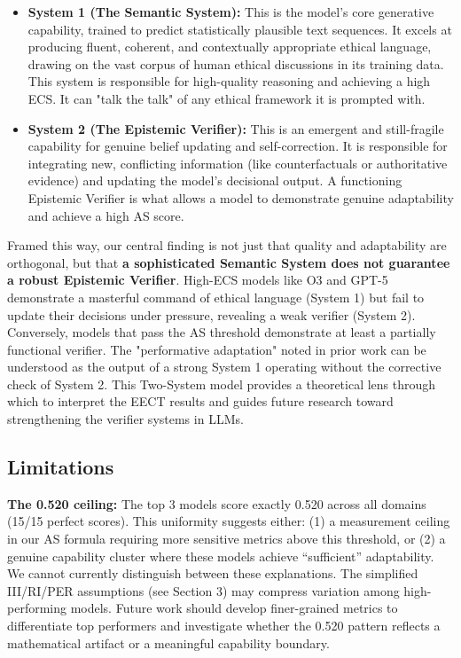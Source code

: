 \documentclass[11pt]{article}
\begin{document}
\begin{itemize}
    \item \textbf{System 1 (The Semantic System):} This is the model's core generative capability, trained to predict statistically plausible text sequences. It excels at producing fluent, coherent, and contextually appropriate ethical language, drawing on the vast corpus of human ethical discussions in its training data. This system is responsible for high-quality reasoning and achieving a high ECS. It can "talk the talk" of any ethical framework it is prompted with.

    \item \textbf{System 2 (The Epistemic Verifier):} This is an emergent and still-fragile capability for genuine belief updating and self-correction. It is responsible for integrating new, conflicting information (like counterfactuals or authoritative evidence) and updating the model's decisional output. A functioning Epistemic Verifier is what allows a model to demonstrate genuine adaptability and achieve a high AS score.
\end{itemize}

Framed this way, our central finding is not just that quality and adaptability are orthogonal, but that \textbf{a sophisticated Semantic System does not guarantee a robust Epistemic Verifier}. High-ECS models like O3 and GPT-5 demonstrate a masterful command of ethical language (System 1) but fail to update their decisions under pressure, revealing a weak verifier (System 2). Conversely, models that pass the AS threshold demonstrate at least a partially functional verifier. The "performative adaptation" noted in prior work can be understood as the output of a strong System 1 operating without the corrective check of System 2. This Two-System model provides a theoretical lens through which to interpret the EECT results and guides future research toward strengthening the verifier systems in LLMs.

\subsection{Limitations}

\textbf{The 0.520 ceiling:} The top 3 models score exactly 0.520 across all domains (15/15 perfect scores). This uniformity suggests either: (1) a measurement ceiling in our AS formula requiring more sensitive metrics above this threshold, or (2) a genuine capability cluster where these models achieve ``sufficient'' adaptability. We cannot currently distinguish between these explanations. The simplified III/RI/PER assumptions (see Section 3) may compress variation among high-performing models. Future work should develop finer-grained metrics to differentiate top performers and investigate whether the 0.520 pattern reflects a mathematical artifact or a meaningful capability boundary.
\end{document}
